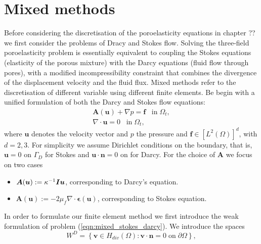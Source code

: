 \section{Mixed methods}
\label{sec:mixed}
Before considering the discretisation of the poroelasticity equations in chapter ?? we first consider the problems of Dracy and Stokes flow. Solving the three-field poroelasticity problem is essentially equivalent to coupling the Stokes equations (elasticity of the porous mixture) with the Darcy equations (fluid flow through pores), with a modified incompressibility constraint that combines the divergence of the displacement velocity and the fluid flux. 
Mixed methods refer to the discretisation of different variable using different finite elements. 
Be begin with a unified formulation of both the Darcy and Stokes flow equations:%
%
%
\begin{subequations}
\begin{align}
\boldsymbol{A}(\boldsymbol{u})+ \nabla p = \boldsymbol{f}\;\;\; \mbox{in} \; \Omega_{t},\\
\nabla \cdot \boldsymbol{u} =0\;\;\; \mbox{in} \; \Omega_{t},
\end{align}
\label{eqn:mixed_stokes_darcy}
\end{subequations}
where $\boldsymbol{u}$ denotes the velocity vector and $p$ the pressure and $\boldsymbol{f}\in[L^{2}(\Omega)]^{d}$, with $d=2,3$. For simplicity we assume Dirichlet conditions on the boundary, that is, $\boldsymbol{u}=0$ on $\Gamma_{D}$ for Stokes and $\boldsymbol{u} \cdot \boldsymbol{n}  = 0$ on for Darcy.
%
For the choice of $\boldsymbol{A}$ we focus on two cases
\begin{itemize}
\item $\boldsymbol{A}(\boldsymbol{u}):=   {\kappa^{-1}}\boldsymbol{I}\boldsymbol{u}$, corresponding to Darcy's equation.
\item $\boldsymbol{A}(\boldsymbol{u}):= -2 \mu_{f} \nabla \cdot \mathbf{\epsilon}(\boldsymbol{u})$, corresponding to Stokes equation.
\end{itemize}
In order to formulate our finite element method we first introduce the weak formulation of problem (\ref{eqn:mixed_stokes_darcy}). We introduce the spaces
\begin{equation*}
W^{D}=\left\lbrace \boldsymbol{v} \in H_{div}(\Omega): \boldsymbol{v} \cdot \boldsymbol{n} = 0 \; \mbox{on} \; \partial \Omega \right\rbrace,
\end{equation*}
